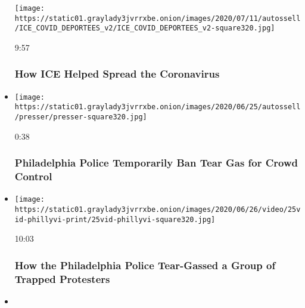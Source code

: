 \begin{itemize}
  \texttt{[image: https://static01.graylady3jvrrxbe.onion/images/2020/07/11/autossell/ICE\_COVID\_DEPORTEES\_v2/ICE\_COVID\_DEPORTEES\_v2-square320.jpg]}

  9:57

  \hypertarget{how-ice-helped-spread-the-coronavirus}{%
  \subsubsection{How ICE Helped Spread the
  Coronavirus}\label{how-ice-helped-spread-the-coronavirus}}
\item
  \href{https://www.nytimes3xbfgragh.onion/video/us/100000007210395/philadelphia-police-ban-tear-gas.html?action=click\&module=video-series-bar\&region=header\&pgtype=Article\&playlistId=video/investigations}{}

  \texttt{[image: https://static01.graylady3jvrrxbe.onion/images/2020/06/25/autossell/presser/presser-square320.jpg]}

  0:38

  \hypertarget{philadelphia-police-temporarily-ban-tear-gas-for-crowd-control}{%
  \subsubsection{Philadelphia Police Temporarily Ban Tear Gas for Crowd
  Control}\label{philadelphia-police-temporarily-ban-tear-gas-for-crowd-control}}
\item
  \href{https://www.nytimes3xbfgragh.onion/video/us/100000007174941/philadelphia-tear-gas-george-floyd-protests.html?action=click\&module=video-series-bar\&region=header\&pgtype=Article\&playlistId=video/investigations}{}

  \texttt{[image: https://static01.graylady3jvrrxbe.onion/images/2020/06/26/video/25vid-phillyvi-print/25vid-phillyvi-square320.jpg]}

  10:03

  \hypertarget{how-the-philadelphia-police-tear-gassed-a-group-of-trapped-protesters}{%
  \subsubsection{How the Philadelphia Police Tear-Gassed a Group of
  Trapped
  Protesters}\label{how-the-philadelphia-police-tear-gassed-a-group-of-trapped-protesters}}
\item
  \href{https://www.nytimes3xbfgragh.onion/video/us/100000007198581/rayshard-brooks-killing-garrett-rolfe.html?action=click\&module=video-series-bar\&region=header\&pgtype=Article\&playlistId=video/investigations}{}


\end{itemize}
